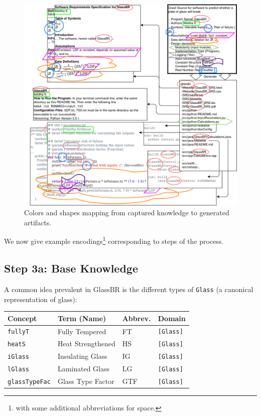 \documentclass[sigconf,review,anonymous=false]{acmart}
\begin{document}
\begin{figure}[h]
  \centering
  \includegraphics[width=\linewidth]{assets/DrasilSupportsChange-right-portrait-overlapped-ungrouped-11ptFont-squished-noSmith-v1-300dpi.png}
  \caption{Colors and shapes mapping from captured knowledge to generated
  artifacts.}
  \label{Fig_DrasilAndChange}
\end{figure}

We now give example encodings\footnote{with some additional abbreviations 
for space.}
corresponding to steps of the process.
\subsection*{Step 3a: Base Knowledge}

A common idea prevalent in GlassBR is the different types 
of \texttt{Glass} (a canonical representation of glass):

\begin{center}
  \begin{tabular}{|l|l|l|l|}
    \hline
    \textbf{Concept} & \textbf{Term (Name)} & \textbf{Abbrev.} & \textbf{Domain} \\ \hline
    \texttt{fullyT} & Fully Tempered & FT & \texttt{[Glass]} \\ \hline
    \texttt{heatS} & Heat Strengthened & HS & \texttt{[Glass]} \\ \hline
    \texttt{iGlass} & Insulating Glass & IG & \texttt{[Glass]} \\ \hline
    \texttt{lGlass} & Laminated Glass & LG & \texttt{[Glass]} \\ \hline
    \texttt{glassTypeFac} & Glass Type Factor & GTF & \texttt{[Glass]} \\ \hline
  \end{tabular}
\end{center}
\end{document}
